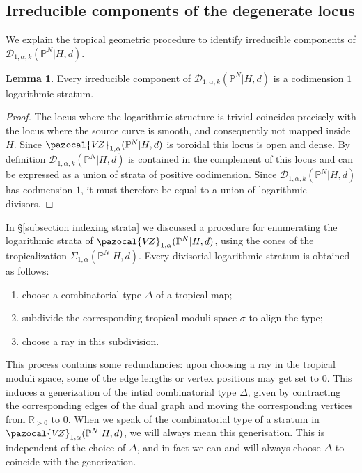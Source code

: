 \documentclass[11pt]{amsart}
\newcommand{\PP}{\mathbb P}
\newcommand{\VZ}{\pazocal{V\!Z}}
\newcommand{\Dcal}{\mathcal{D}}
\newcommand{\RR}{\mathbb{R}}
\theoremstyle{definition}
\newtheorem{lemma}[thm]{Lemma}
\theoremstyle{definition}
\begin{document}
\subsection{Irreducible components of the degenerate locus} We explain the tropical geometric procedure to identify irreducible components of $\Dcal_{1,\alpha,k}(\PP^N|H,d)$.

\begin{lemma} \label{Lemma components are logarithmic divisors} Every irreducible component of $\Dcal_{1,\alpha,k}(\PP^N|H,d)$ is a codimension $1$ logarithmic stratum.\end{lemma}

\begin{proof} The locus where the logarithmic structure is trivial coincides precisely with the  locus where the source curve is smooth, and consequently not mapped inside $H$. Since $\VZ_{1,\alpha}(\PP^N|H,d)$ is toroidal this locus is open and dense. By definition $\Dcal_{1,\alpha,k}(\PP^N|H,d)$ is contained in the  complement of this locus and can be expressed as a union of strata of positive codimension. Since $\Dcal_{1,\alpha,k}(\PP^N|H,d)$ has codmension $1$, it must therefore be equal to a union of logarithmic divisors.\end{proof}

In \S \ref{subsection indexing strata} we discussed a procedure for enumerating the logarithmic strata of $\VZ_{1,\alpha}(\PP^N|H,d)$, using the cones of the tropicalization $\Sigma_{1,\alpha}(\PP^N|H,d)$. Every divisorial logarithmic stratum is obtained as follows:
\begin{enumerate}
\item choose a combinatorial type $\Delta$ of a tropical map;
\item subdivide the corresponding tropical moduli space $\sigma$ to align the type;
\item choose a ray in this subdivision.
\end{enumerate}
This process contains some redundancies: upon choosing a ray in the tropical moduli space, some of the edge lengths or vertex positions may get set to $0$. This induces a generization of the intial combinatorial type $\Delta$, given by contracting the corresponding edges of the dual graph and moving the corresponding vertices from $\RR_{>0}$ to $0$. When we speak of the combinatorial type of a stratum in $\VZ_{1,\alpha}(\PP^N|H,d)$, we will always mean this generisation. This is independent of the choice of $\Delta$, and in fact we can and will always choose $\Delta$ to coincide with the generization.
\end{document}
